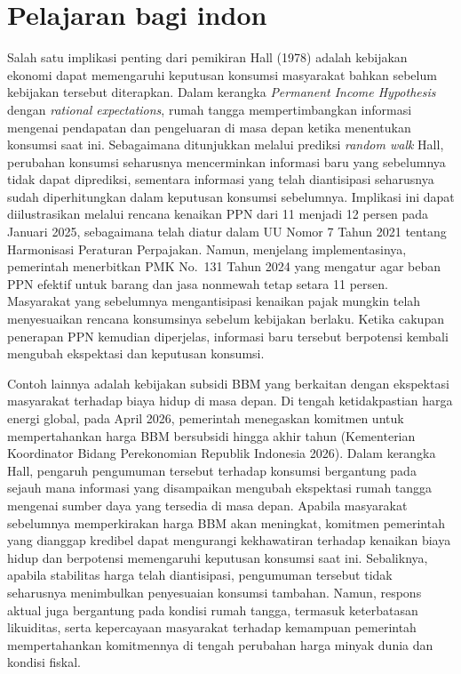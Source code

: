 \documentclass[
  manuscript=article,
  layout=brief,
  year=2026,
  volume=1,
]{den}
\begin{document}
\section{Pelajaran bagi indon}\label{pelajaran-bagi-indon}

Salah satu implikasi penting dari pemikiran Hall (1978) adalah kebijakan
ekonomi dapat memengaruhi keputusan konsumsi masyarakat bahkan sebelum
kebijakan tersebut diterapkan. Dalam kerangka \emph{Permanent Income
Hypothesis} dengan \emph{rational expectations}, rumah tangga
mempertimbangkan informasi mengenai pendapatan dan pengeluaran di masa
depan ketika menentukan konsumsi saat ini. Sebagaimana ditunjukkan
melalui prediksi \emph{random walk} Hall, perubahan konsumsi seharusnya
mencerminkan informasi baru yang sebelumnya tidak dapat diprediksi,
sementara informasi yang telah diantisipasi seharusnya sudah
diperhitungkan dalam keputusan konsumsi sebelumnya. Implikasi ini dapat
diilustrasikan melalui rencana kenaikan PPN dari 11 menjadi 12 persen
pada Januari 2025, sebagaimana telah diatur dalam UU Nomor 7 Tahun 2021
tentang Harmonisasi Peraturan Perpajakan. Namun, menjelang
implementasinya, pemerintah menerbitkan PMK No.~131 Tahun 2024 yang
mengatur agar beban PPN efektif untuk barang dan jasa nonmewah tetap
setara 11 persen. Masyarakat yang sebelumnya mengantisipasi kenaikan
pajak mungkin telah menyesuaikan rencana konsumsinya sebelum kebijakan
berlaku. Ketika cakupan penerapan PPN kemudian diperjelas, informasi
baru tersebut berpotensi kembali mengubah ekspektasi dan keputusan
konsumsi.

Contoh lainnya adalah kebijakan subsidi BBM yang berkaitan dengan
ekspektasi masyarakat terhadap biaya hidup di masa depan. Di tengah
ketidakpastian harga energi global, pada April 2026, pemerintah
menegaskan komitmen untuk mempertahankan harga BBM bersubsidi hingga
akhir tahun (Kementerian Koordinator Bidang Perekonomian Republik
Indonesia 2026). Dalam kerangka Hall, pengaruh pengumuman tersebut
terhadap konsumsi bergantung pada sejauh mana informasi yang disampaikan
mengubah ekspektasi rumah tangga mengenai sumber daya yang tersedia di
masa depan. Apabila masyarakat sebelumnya memperkirakan harga BBM akan
meningkat, komitmen pemerintah yang dianggap kredibel dapat mengurangi
kekhawatiran terhadap kenaikan biaya hidup dan berpotensi memengaruhi
keputusan konsumsi saat ini. Sebaliknya, apabila stabilitas harga telah
diantisipasi, pengumuman tersebut tidak seharusnya menimbulkan
penyesuaian konsumsi tambahan. Namun, respons aktual juga bergantung
pada kondisi rumah tangga, termasuk keterbatasan likuiditas, serta
kepercayaan masyarakat terhadap kemampuan pemerintah mempertahankan
komitmennya di tengah perubahan harga minyak dunia dan kondisi fiskal.
\end{document}
